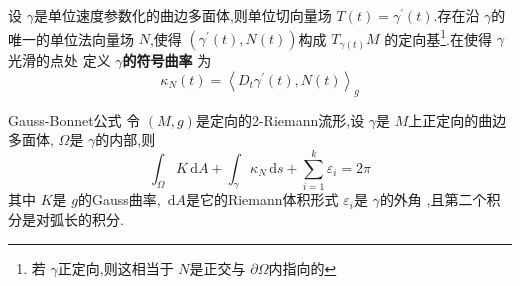 \documentclass[../../main.tex]{subfiles}
\begin{document}
\begin{definition}
    设 \(   \gamma   \)是单位速度参数化的曲边多面体,则单位切向量场 \(  T\left( t \right)=  \gamma ^{\prime} \left( t \right)    \).存在沿 \(   \gamma   \)的唯一的单位法向量场 \(  N  \),使得 \(  \left(  \gamma ^{\prime} \left( t \right),N\left( t \right)   \right)   \)构成 \(  T_{ \gamma \left( t \right) }M  \)      的定向基\footnote{若 \(   \gamma   \)正定向,则这相当于 \(  N  \)是正交与 \(   \partial  \Omega   \)内指向的   }.在使得 \(   \gamma   \)光滑的点处 定义 \textbf{\(   \gamma   \)的符号曲率 }为 \[
     \kappa _{N}\left( t \right)= \left<D_{t} \gamma ^{\prime} \left( t \right),N\left( t \right)   \right>_{g} 
    \] 
\end{definition}

\begin{theorem}{Gauss-Bonnet公式}
    令 \(  \left( M,g \right)   \)是定向的2-Riemann流形,设 \(   \gamma   \)是 \(  M  \)上正定向的曲边多面体, \(   \Omega   \)是 \(   \gamma   \)的内部,则 \[
    \int_{ \Omega }K\,\mathrm{d} A+  \int_{ \gamma } \kappa _{N}\,\mathrm{d} s+ \sum _{i= 1}^{k} \varepsilon _{i}= 2\pi 
    \]     其中 \(  K  \)是 \(  g  \)的Gauss曲率, \(  \,\mathrm{d} A  \)是它的Riemann体积形式 \(   \varepsilon _{i}  \)是 \(   \gamma   \)的外角  ,且第二个积分是对弧长的积分.   
\end{theorem}
\end{document}
